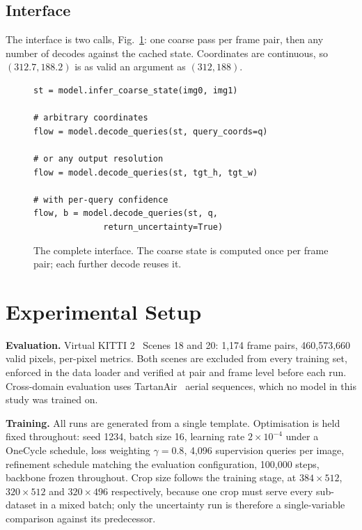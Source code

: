 \documentclass[conference]{IEEEtran}
\begin{document}
\subsection{Interface}

The interface is two calls, Fig.~\ref{fig:api}: one coarse pass per frame pair,
then any number of decodes against the cached state. Coordinates are
continuous, so $(312.7, 188.2)$ is as valid an argument as $(312, 188)$.

\begin{figure}[t]
\begin{footnotesize}
\begin{verbatim}
st = model.infer_coarse_state(img0, img1)

# arbitrary coordinates
flow = model.decode_queries(st, query_coords=q)

# or any output resolution
flow = model.decode_queries(st, tgt_h, tgt_w)

# with per-query confidence
flow, b = model.decode_queries(st, q,
              return_uncertainty=True)
\end{verbatim}
\end{footnotesize}
\caption{The complete interface. The coarse state is computed once per frame
pair; each further decode reuses it.}
\label{fig:api}
\end{figure}

\section{Experimental Setup}

\textbf{Evaluation.} Virtual KITTI 2~\cite{vkitti2} Scenes 18 and 20:
1{,}174 frame pairs, 460{,}573{,}660 valid pixels, per-pixel metrics. Both scenes
are excluded from every training set, enforced in the data loader and verified at
pair and frame level before each run. Cross-domain evaluation uses
TartanAir~\cite{tartanair} aerial sequences, which no model in this study was
trained on.

\textbf{Training.} All runs are generated from a single template. Optimisation is
held fixed throughout: seed 1234, batch size 16, learning rate
$2\times10^{-4}$ under a OneCycle schedule, loss weighting $\gamma = 0.8$,
4{,}096 supervision queries per image, refinement schedule matching the
evaluation configuration, 100{,}000 steps, backbone frozen throughout. Crop size
follows the training stage, at $384{\times}512$, $320{\times}512$ and
$320{\times}496$ respectively, because one crop must serve every sub-dataset in a
mixed batch; only the uncertainty run is therefore a single-variable comparison
against its predecessor.
\end{document}
